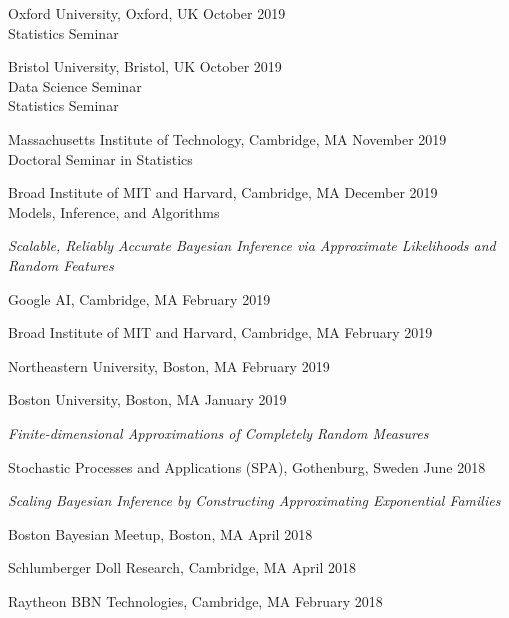 \documentclass[margin,line]{res}
\newenvironment{talkgroup}{\setlength{\parskip}{3pt}\everypar{\hangafter=1\hangindent=1em\relax}\par}{\par\everypar{\hangafter=0\relax}}
\begin{document}
\begin{resume}
\begin{talkgroup}
Oxford University, Oxford, UK \hfill October 2019 \\
Statistics Seminar

Bristol University, Bristol, UK \hfill October 2019 \\
Data Science Seminar \\
Statistics Seminar

Massachusetts Institute of Technology, Cambridge, MA  \hfill November 2019 \\
Doctoral Seminar in Statistics

Broad Institute of MIT and Harvard, Cambridge, MA \hfill December 2019 \\
Models, Inference, and Algorithms

\end{talkgroup}

\emph{Scalable, Reliably Accurate Bayesian Inference via Approximate Likelihoods and Random Features}

\begin{talkgroup}
Google AI, Cambridge, MA \hfill February 2019

Broad Institute of MIT and Harvard, Cambridge, MA \hfill February 2019

Northeastern University, Boston, MA \hfill February 2019

Boston University, Boston, MA \hfill January 2019

\end{talkgroup}

\emph{Finite-dimensional Approximations of Completely Random Measures}

\begin{talkgroup}
Stochastic Processes and Applications (SPA), Gothenburg, Sweden \hfill June 2018

\end{talkgroup}


\emph{Scaling Bayesian Inference by Constructing Approximating Exponential Families}

\begin{talkgroup}
Boston Bayesian Meetup, Boston, MA \hfill April 2018

Schlumberger Doll Research, Cambridge, MA \hfill April 2018

Raytheon BBN Technologies, Cambridge, MA \hfill February 2018


\end{talkgroup}
\end{resume}
\end{document}
